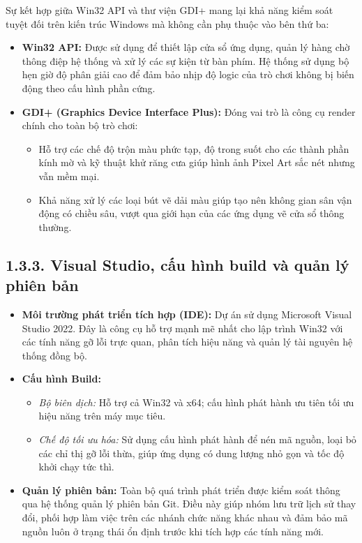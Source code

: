 \noindent \indent Sự kết hợp giữa Win32 API và thư viện GDI+ mang lại khả năng kiểm soát tuyệt đối trên kiến trúc Windows mà không cần phụ thuộc vào bên thứ ba:

\begin{itemize}
    \item \textbf{Win32 API:} Được sử dụng để thiết lập cửa sổ ứng dụng, quản lý hàng chờ thông điệp hệ thống và xử lý các sự kiện từ bàn phím. Hệ thống sử dụng bộ hẹn giờ độ phân giải cao để đảm bảo nhịp độ logic của trò chơi không bị biến động theo cấu hình phần cứng.
    \item \textbf{GDI+ (Graphics Device Interface Plus):} Đóng vai trò là công cụ render chính cho toàn bộ trò chơi:
    \begin{itemize}
        \item Hỗ trợ các chế độ trộn màu phức tạp, độ trong suốt cho các thành phần kính mờ và kỹ thuật khử răng cưa giúp hình ảnh Pixel Art sắc nét nhưng vẫn mềm mại.
        \item Khả năng xử lý các loại bút vẽ dải màu giúp tạo nên không gian sân vận động có chiều sâu, vượt qua giới hạn của các ứng dụng vẽ cửa sổ thông thường.
    \end{itemize}
\end{itemize}

\subsection*{1.3.3. Visual Studio, cấu hình build và quản lý phiên bản}

\begin{itemize}
    \item \textbf{Môi trường phát triển tích hợp (IDE):} Dự án sử dụng Microsoft Visual Studio 2022. Đây là công cụ hỗ trợ mạnh mẽ nhất cho lập trình Win32 với các tính năng gỡ lỗi trực quan, phân tích hiệu năng và quản lý tài nguyên hệ thống đồng bộ.
    \item \textbf{Cấu hình Build:}
    \begin{itemize}
        \item \textit{Bộ biên dịch:} Hỗ trợ cả Win32 và x64; cấu hình phát hành ưu tiên tối ưu hiệu năng trên máy mục tiêu.
        \item \textit{Chế độ tối ưu hóa:} Sử dụng cấu hình phát hành để nén mã nguồn, loại bỏ các chỉ thị gỡ lỗi thừa, giúp ứng dụng có dung lượng nhỏ gọn và tốc độ khởi chạy tức thì.
    \end{itemize}
    \item \textbf{Quản lý phiên bản:} Toàn bộ quá trình phát triển được kiểm soát thông qua hệ thống quản lý phiên bản Git. Điều này giúp nhóm lưu trữ lịch sử thay đổi, phối hợp làm việc trên các nhánh chức năng khác nhau và đảm bảo mã nguồn luôn ở trạng thái ổn định trước khi tích hợp các tính năng mới.
\end{itemize}


